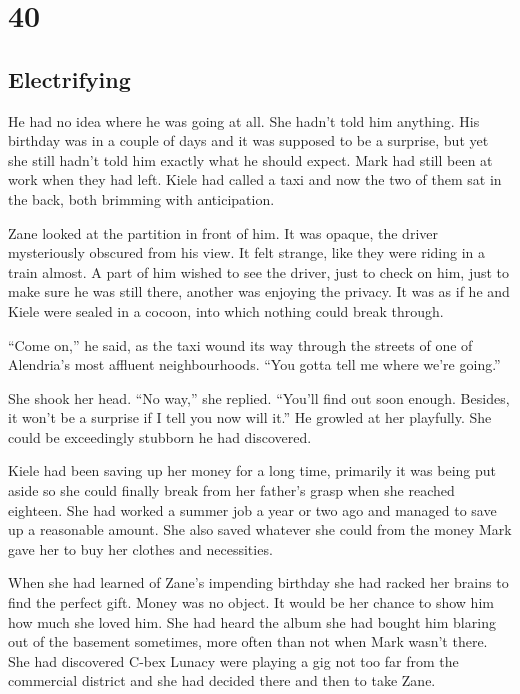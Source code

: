 \chapter{40}
\section{Electrifying}


He had no idea where he was going at all.  She hadn't told him anything.  His birthday was in a couple of days and it was supposed to be a surprise, but yet she still hadn't told him exactly what he should expect.  Mark had still been at work when they had left.  Kiele had called a taxi and now the two of them sat in the back, both brimming with anticipation.  

Zane looked at the partition in front of him.  It was opaque, the driver mysteriously obscured from his view.  It felt strange, like they were riding in a train almost.  A part of him wished to see the driver, just to check on him, just to make sure he was still there, another was enjoying the privacy.  It was as if he and Kiele were sealed in a cocoon, into which nothing could break through.  

``Come on,'' he said, as the taxi wound its way through the streets of one of Alendria's most affluent neighbourhoods.  ``You gotta tell me where we're going.''

She shook her head.  ``No way,'' she replied.  ``You'll find out soon enough.  Besides, it won't be a surprise if I tell you now will it.''  He growled at her playfully.  She could be exceedingly stubborn he had discovered.  

Kiele had been saving up her money for a long time, primarily it was being put aside so she could finally break from her father's grasp when she reached eighteen.  She had worked a summer job a year or two ago and managed to save up a reasonable amount.  She also saved whatever she could from the money Mark gave her to buy her clothes and necessities.

When she had learned of Zane's impending birthday she had racked her brains to find the perfect gift.  Money was no object.  It would be her chance to show him how much she loved him.  She had heard the album she had bought him blaring out of the basement sometimes, more often than not when Mark wasn't there.  She had discovered C-bex Lunacy were playing a gig not too far from the commercial district and she had decided there and then to take Zane.  

